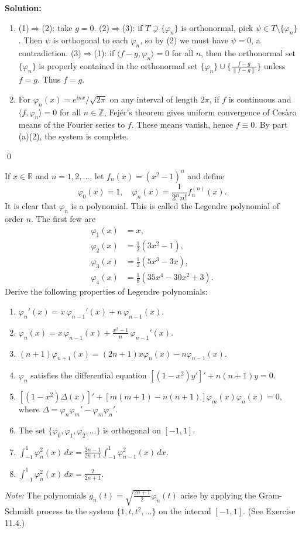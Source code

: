 \noindent\textbf{Solution:}
\begin{enumerate}[label=(\alph*)]
\item (1)$\Rightarrow$(2): take $g=0$. (2)$\Rightarrow$(3): if $T\supsetneq\{\varphi_n\}$ is orthonormal, pick $\psi\in T\setminus\{\varphi_n\}$. Then $\psi$ is orthogonal to each $\varphi_n$, so by (2) we must have $\psi=0$, a contradiction. (3)$\Rightarrow$(1): if $\langle f- g,\varphi_n\rangle=0$ for all $n$, then the orthonormal set $\{\varphi_n\}$ is properly contained in the orthonormal set $\{\varphi_n\}\cup\{\tfrac{f-g}{\|f-g\|}\}$ unless $f=g$. Thus $f=g$.
\item For $\varphi_n(x)=e^{inx}/\sqrt{2\pi}$ on any interval of length $2\pi$, if $f$ is continuous and $\langle f,\varphi_n\rangle=0$ for all $n\in\mathbb Z$, Fejér's theorem gives uniform convergence of Cesàro means of the Fourier series to $f$. These means vanish, hence $f\equiv 0$. By part (a)(2), the system is complete.
\end{enumerate}\qed


\begin{problembox}
If $x \in \mathbb{R}$ and $n = 1, 2, \dots$, let $f_n(x) = (x^2 - 1)^n$ and define
\[
\varphi_0(x) = 1, \quad \varphi_n(x) = \frac{1}{2^{n}n!} f_n^{(n)}(x).
\]
It is clear that $\varphi_n$ is a polynomial. This is called the Legendre polynomial of order $n$. The first few are
\[
\begin{aligned}
\varphi_1(x) &= x, \\
\varphi_2(x) &= \frac{1}{2}(3x^2 - 1), \\
\varphi_3(x) &= \frac{1}{2}(5x^3 - 3x), \\
\varphi_4(x) &= \frac{1}{8}(35x^4 - 30x^2 + 3).
\end{aligned}
\]
Derive the following properties of Legendre polynomials:
\begin{enumerate}[label=(\alph*)]
\item $\varphi_n'(x) = x \, \varphi_{n-1}'(x) + n \, \varphi_{n-1}(x)$.
\item $\varphi_n(x) = x \, \varphi_{n-1}(x) + \frac{x^2 - 1}{n} \, \varphi_{n-1}'(x)$.
\item $(n + 1) \varphi_{n+1}(x) = (2n + 1) x \varphi_n(x) - n \varphi_{n-1}(x)$.
\item $\varphi_n$ satisfies the differential equation $[(1 - x^2) y']' + n(n + 1) y = 0$.
\item $[(1 - x^2) \Delta(x)]' + [m(m + 1) - n(n + 1)] \varphi_m(x) \varphi_n(x) = 0$, where $\Delta = \varphi_n \varphi_m' - \varphi_m \varphi_n'$.
\item The set $\{\varphi_0, \varphi_1, \varphi_2, \dots\}$ is orthogonal on $[-1, 1]$.
\item $\int_{-1}^1 \varphi_n^2(x) \, dx = \frac{2n - 1}{2n + 1} \int_{-1}^1 \varphi_{n-1}^2(x) \, dx$.
\item $\int_{-1}^1 \varphi_n^2(x)\, dx = \frac{2}{2n+1}$.
\end{enumerate}
\textit{Note:} The polynomials $g_n(t) = \sqrt{\frac{2n + 1}{2}} \varphi_n(t)$ arise by applying the Gram-Schmidt process to the system $\{1, t, t^2, \dots\}$ on the interval $[-1, 1]$. (See Exercise 11.4.)
\end{problembox}

